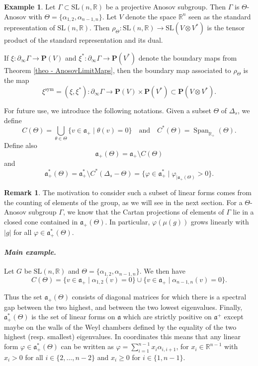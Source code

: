 \documentclass[11pt]{article}
\newcommand{\resp}{resp.\xspace}
\numberwithin{equation}{section}
\newcommand{\quand}{\quad\text{and}\quad}
\newcommand{\sym}{\mathrm{sym}}
\theoremstyle{definition}
\newtheorem{example}[theo]{Example}
\newtheorem{rmk}[theo]{Remark}
\newcommand{\proj}{\mathbf{P}}
\newcommand{\R}{\mathbb{R}}
\newcommand{\SL}{\mathrm{SL}}
\newcommand{\fa}{\mathfrak{a}}
\DeclareMathOperator{\Span}{Span}
\let\phi\varphi
\let\G\Gamma
\begin{document}
\begin{example} \label{example - Symmetric boundary map}
Let $\Gamma \subset \SL(n,\R)$ be a projective Anosov subgroup. Then $\Gamma$ is $\Theta$\nobreakdash-Anosov with $\Theta = \{\alpha_{1,2}, \alpha_{n-1,n}\}$. Let $V$ denote the space $\R^n$ seen as the standard representation of $\SL(n,\R)$. Then $\rho_\Theta: \SL(n,\R) \to \SL(V\otimes V^*)$ is the tensor product of the standard representation and its dual.

If $\xi:\partial_\infty \G \to \proj (V)$ and $\xi^*:\partial_\infty \G \to \proj(V^*)$ denote the boundary maps from Theorem \ref{theo - AnosovLimitMaps}, then the boundary map associated to $\rho_\Theta$ is the map
\[\xi^{\sym} = (\xi, \xi^*): \partial_\infty \Gamma \to \proj(V)\times \proj(V^*) \subset \proj(V\otimes V^*).\]
\end{example}

For future use, we introduce the following notations. Given a subset $\Theta$ of $\Delta_s$, we define
\[C(\Theta) = \bigcup_{\theta \in \Theta}\{v\in \fa_+ \mid \theta(v) = 0\}\quand
C^*(\Theta) = \Span_{\R_+}(\Theta).\]
Define also
\[\fa_+(\Theta) = \fa_+ \setminus C(\Theta)\]
and
\[\fa_+^*(\Theta) = \fa_+^* \setminus C^*(\Delta_s -\Theta) = \{\phi \in \fa_+^*\mid \phi_{\vert \fa_+(\Theta)} >0\}.\]

\begin{rmk}
The motivation to consider such a subset of linear forms comes from the counting of elements of the group, as we will see in the next section. For a $\Theta$\nobreakdash-Anosov subgroup $\G$, we know that the Cartan projections of elements of $\G$ lie in a closed cone contained in $\fa_+(\Theta)$. In particular, $\phi(\mu(g))$ grows linearly with $|g|$ for all $\phi\in\fa_+^*(\Theta)$.
\end{rmk}

\paragraph{{\it Main example.}} Let $G$ be $\SL(n,\R)$ and $\Theta = \{\alpha_{1,2}, \alpha_{n-1,n}\}$. We then have
\[C(\Theta) = \{v\in \fa_+\mid \alpha_{1,2} (v) = 0 \}\cup \{v\in \fa_+\mid \alpha_{n-1,n} (v) = 0 \}.\]

Thus the set $\mathfrak{a}_+(\Theta)$ consists of diagonal matrices for which there is a spectral gap between the two highest, and between the two lowest eigenvalues.
Finally, $\fa_+^*(\Theta)$ is the set of linear forms on $\fa$ which are strictly positive on $\fa^+$ except maybe on the walls of the Weyl chambers defined by the equality of the two highest (\resp smallest) eigenvalues. In coordinates this means that any linear form $\phi\in \fa_+^*(\Theta)$ can be written as $\phi= \sum_{i=1}^{n-1} x_i \alpha_{i,i+1}$, for $x_i \in \R^{n-1}$ with $x_i> 0$ for all $i \in \{ 2, \dots, n-2\}$ and $x_i\geq 0$ for $i\in \{ 1, n-1\}$.
\end{document}
